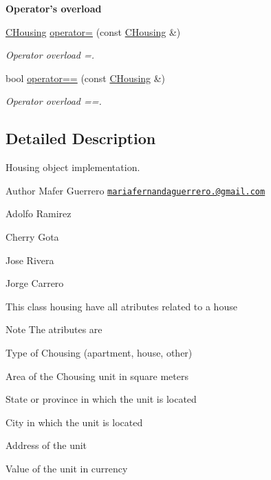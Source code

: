 \begin{Indent}{\bf Operator's overload}\par
\begin{DoxyCompactItemize}
\item 
\hyperlink{class_c_housing}{C\+Housing} \hyperlink{class_c_housing_ab0ce97d73e0e23d00a326be11e93b600}{operator=} (const \hyperlink{class_c_housing}{C\+Housing} \&)
\begin{DoxyCompactList}\small\item\em Operator overload =. \end{DoxyCompactList}\item 
bool \hyperlink{class_c_housing_a73b234465e958af3748e1fec91a6f997}{operator==} (const \hyperlink{class_c_housing}{C\+Housing} \&)
\begin{DoxyCompactList}\small\item\em Operator overload ==. \end{DoxyCompactList}\end{DoxyCompactItemize}
\end{Indent}


\subsection{Detailed Description}
Housing object implementation. 

\begin{DoxyAuthor}{Author}
Mafer Guerrero  \href{mailto:mariafernandaguerrero.25@gmail.com}{\tt mariafernandaguerrero.@gmail.\+com} 

Adolfo Ramirez 

Cherry Gota 

Jose Rivera 

Jorge Carrero
\end{DoxyAuthor}
This class housing have all atributes related to a house \begin{DoxyNote}{Note}
The atributes are
\end{DoxyNote}

\begin{DoxyItemize}
\item Type of Chousing (apartment, house, other)
\item Area of the Chousing unit in square meters
\item State or province in which the unit is located
\item City in which the unit is located
\item Address of the unit
\item Value of the unit in currency 
\end{DoxyItemize}

